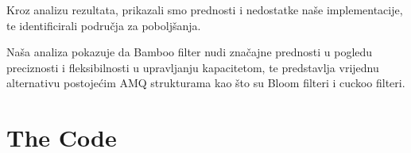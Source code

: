 \documentclass[seminarskirad]{fer}
\begin{document}
Kroz analizu rezultata, prikazali smo prednosti i nedostatke naše implementacije, te identificirali područja za poboljšanja. 

Naša analiza pokazuje da Bamboo filter nudi značajne prednosti u pogledu preciznosti i fleksibilnosti u upravljanju kapacitetom, te predstavlja vrijednu alternativu postojećim AMQ strukturama kao što su Bloom filteri i cuckoo filteri.








\backmatter

\chapter{The Code}

\Blindtext
\end{document}
